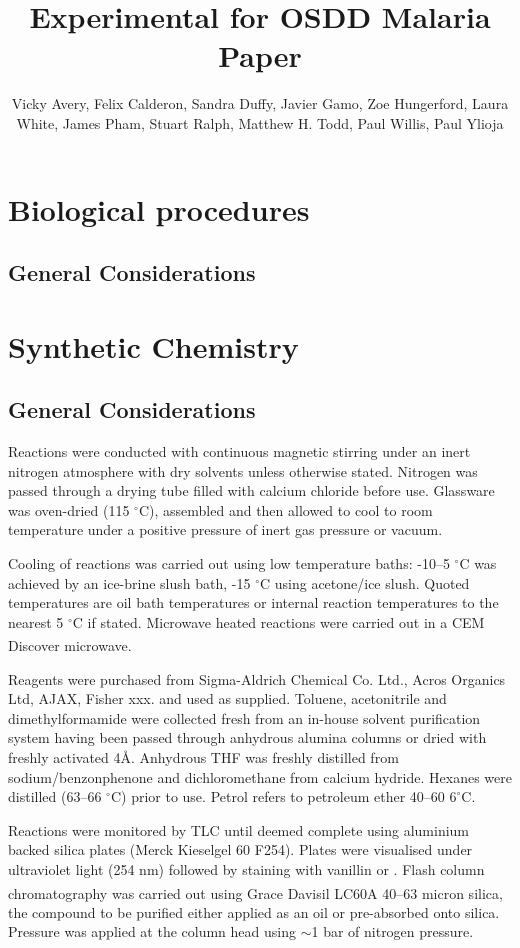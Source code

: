 \documentclass[12pt, a4paper,titlepage]{article}
\title{Experimental for OSDD Malaria Paper }
\author{Vicky Avery, Felix Calderon, Sandra Duffy, Javier Gamo, Zoe Hungerford, Laura White, James Pham, Stuart Ralph, Matthew H. Todd, Paul Willis, Paul Ylioja}
\begin{document}
\section{Biological procedures}

\subsection{General Considerations}

\section{Synthetic Chemistry}

\subsection{General Considerations}
Reactions were conducted with continuous magnetic stirring under an inert nitrogen atmosphere with dry solvents unless otherwise stated. Nitrogen was passed through a drying tube filled with calcium chloride before use. Glassware was oven-dried (115 $^{\circ}$C), assembled and then allowed to cool to room temperature under a positive pressure of inert gas pressure or vacuum. 

Cooling of reactions was carried out using low temperature baths: -10--5 $^\circ$C was achieved by an ice-brine slush bath, -15 $^\circ$C using acetone/ice slush. Quoted temperatures are oil bath temperatures or internal reaction temperatures to the nearest 5 $^\circ$C if stated. Microwave heated reactions were carried out in a CEM Discover\textsuperscript{\textregistered} microwave.

Reagents were purchased from Sigma-Aldrich Chemical Co. Ltd., Acros Organics Ltd, AJAX,  Fisher xxx. and used as supplied. Toluene, acetonitrile and dimethylformamide were collected fresh from an in-house solvent purification system having been passed through anhydrous alumina columns or dried with freshly activated 4\AA. Anhydrous THF was freshly distilled from sodium/benzonphenone and dichloromethane from calcium hydride. Hexanes were distilled (63--66 $^\circ$C) prior to use. Petrol refers to petroleum ether 40--60 $6^\circ$C.

Reactions were monitored by TLC until deemed complete using aluminium backed silica plates (Merck Kieselgel 60 F254). Plates were visualised under ultraviolet light (254 nm) followed by staining with vanillin or . Flash column chromatography was carried out using Grace Davisil\textsuperscript{\textregistered} LC60A 40--63 micron silica, the compound to be purified either applied as an oil or pre-absorbed onto silica. Pressure was applied at the column head using $\sim$1 bar of nitrogen pressure.
\end{document}
